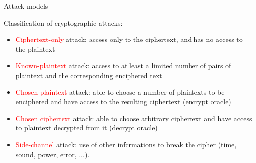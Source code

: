 \begin{frame}{Attack models}

Classification of cryptographic attacks:

\medskip

\begin{itemize}
  \item \textcolor{red}{Ciphertext-only} attack: access only to the ciphertext, and has no access to the plaintext
  \medskip
  \item \textcolor{red}{Known-plaintext} attack: access to at least a limited number of pairs of plaintext and the corresponding enciphered text
  \medskip
  \item \textcolor{red}{Chosen plaintext} attack: able to choose a number of plaintexts to be enciphered and have access to the resulting ciphertext (encrypt oracle)
  \medskip
  \item \textcolor{red}{Chosen ciphertext} attack: able to choose arbitrary ciphertext and have access to plaintext decrypted from it (decrypt oracle) 
  \medskip
  \item \textcolor{red}{Side-channel} attack: use of other informations to break the cipher (time, sound, power, error, ...).
\end{itemize}
  
\end{frame}
